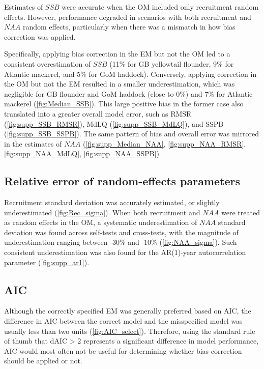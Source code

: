 \documentclass[
  12pt,
]{article}
\begin{document}
Estimates of \(SSB\) were accurate when the OM included only recruitment
random effects. However, performance degraded in scenarios with both
recruitment and \(NAA\) random effects, particularly when there was a
mismatch in how bias correction was applied.

Specifically, applying bias correction in the EM but not the OM led to a
consistent overestimation of \(SSB\) (11\% for GB yellowtail flounder,
9\% for Atlantic mackerel, and 5\% for GoM haddock). Conversely,
applying correction in the OM but not the EM resulted in a smaller
underestimation, which was negligible for GB flounder and GoM haddock
(close to 0\%) and 7\% for Atlantic mackerel (\autoref{fig:Median_SSB}).
This large positive bias in the former case also translated into a
greater overall model error, such as RMSR (\autoref{fig:supp_SSB_RMSR}),
MdLQ (\autoref{fig:supp_SSB_MdLQ}), and SSPB
(\autoref{fig:supp_SSB_SSPB}). The same pattern of bias and overall
error was mirrored in the estimates of \(NAA\)
(\autoref{fig:supp_Median_NAA}, \autoref{fig:supp_NAA_RMSR},
\autoref{fig:supp_NAA_MdLQ}, \autoref{fig:supp_NAA_SSPB})

\subsection{Relative error of random-effects
parameters}\label{relative-error-of-random-effects-parameters}

Recruitment standard deviation was accurately estimated, or slightly
underestimated (\autoref{fig:Rec_sigma}). When both recruitment and
\(NAA\) were treated as random effects in the OM, a systematic
underestimation of \(NAA\) standard deviation was found across
self-tests and cross-tests, with the magnitude of underestimation
ranging between -30\% and -10\% (\autoref{fig:NAA_sigma}). Such
consistent underestimation was also found for the AR(1)-year
autocorrelation parameter (\autoref{fig:supp_ar1}).

\subsection{AIC}\label{aic}

Although the correctly specified EM was generally preferred based on
AIC, the difference in AIC between the correct model and the
misspecified model was usually less than two units
(\autoref{fig:AIC_select}). Therefore, using the standard rule of thumb
that dAIC \textgreater{} 2 represents a significant difference in model
performance, AIC would most often not be useful for determining whether
bias correction should be applied or not.
\end{document}

